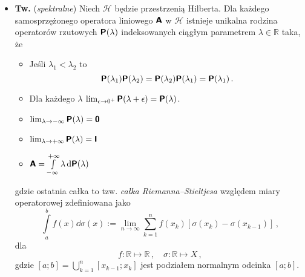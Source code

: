 \documentclass{myclass}
\begin{document}
\begin{itemize}
    
    \item \textbf{Tw.} (\textit{spektralne}) Niech \(\mathscr{H}\) będzie przestrzenią Hilberta. Dla
    każdego samosprzężonego operatora liniowego \(\boldsymbol{\mathsf{A}}\) w \(\mathscr{H}\) istnieje unikalna
    rodzina operatorów rzutowych \(\boldsymbol{\mathsf{P}}(\lambda)\) indeksowanych ciągłym parametrem \(\lambda
    \in \mathbb{R}\) taka, że
    \begin{itemize}
        
        \item Jeśli \(\lambda_1 < \lambda_2\) to
        \begin{equation*}
            \boldsymbol{\mathsf{P}}(\lambda_1)\boldsymbol{\mathsf{P}}(\lambda_2) =
        \boldsymbol{\mathsf{P}}(\lambda_2)\boldsymbol{\mathsf{P}}(\lambda_1) = \boldsymbol{\mathsf{P}}(\lambda_1)\,.
        \end{equation*}

        \item Dla każdego \(\lambda\) \(\lim_{\epsilon\to0^+}\boldsymbol{\mathsf{P}}(\lambda+\epsilon) =
        \boldsymbol{\mathsf{P}}(\lambda)\).
        
        \item \(\lim_{\lambda\to-\infty}\boldsymbol{\mathsf{P}}(\lambda) = \boldsymbol{\mathsf{\mathsf{0}}}\)

        \item \(\lim_{\lambda\to+\infty}\boldsymbol{\mathsf{P}}(\lambda) = \boldsymbol{\mathsf{I}}\)

        \item \(\boldsymbol{\mathsf{A}} = \int\limits_{-\infty}^{+\infty}\lambda \dd{\boldsymbol{\mathsf{P}}(\lambda)}\)

    \end{itemize}
    gdzie ostatnia całka to tzw. \textit{całka Riemanna--Stieltjesa} względem miary operatorowej
    zdefiniowana jako
    \begin{equation*}
            \int\limits_a^b f(x) \dd{\sigma(x)} := \lim_{n\to\infty}\sum_{k=1}^nf(x_k)\left[\sigma(x_k) - \sigma(x_{k-1})\right]\,,
    \end{equation*}
    dla 
    \begin{equation*}
        f: \mathbb{R} \mapsto \mathbb{R}\,,\quad \sigma: \mathbb{R} \mapsto X\,,
    \end{equation*}
    gdzie \([a;b] = \bigcup_{k=1}^{n}[x_{k-1}; x_k]\) jest podziałem normalnym odcinka \([a;b]\).

\end{itemize}
\end{document}
